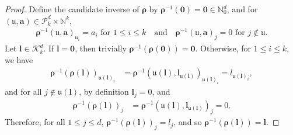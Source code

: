 \documentclass[pdflatex,sn-mathphys-num]{sn-jnl}%
\theoremstyle{thmstyleone}%
\theoremstyle{thmstyletwo}%
\theoremstyle{thmstylethree}%
\begin{document}
\begin{appendices}
\begin{proof} Define the candidate inverse of \(\boldsymbol{\rho}\) by \(\boldsymbol{\rho}^{-1}(\mathbf{0})=\mathbf{0}\in\mathbb{N}_0^d\), and for \((\mathfrak{u},\mathbf{a})\in\mathcal{P}^d_k\times\mathbb{N}^k\),
\begin{align}
    \boldsymbol{\rho}^{-1}(\mathfrak{u},\mathbf{a})_{\mathfrak{u}_i}=
        a_i \textrm{ for }1\leq i\leq k\quad\textrm{and}\quad\boldsymbol{\rho}^{-1}(\mathfrak{u},\mathbf{a})_j=0\textrm{ for }j\notin\mathfrak{u}.\nonumber
\end{align}
Let \(\boldsymbol{l}\in\mathcal{K}^d_k\). If \(\boldsymbol{l}=\mathbf{0}\), then trivially \(\boldsymbol{\rho}^{-1}(\boldsymbol{\rho}(\mathbf{0}))=\mathbf{0}\). Otherwise, for \(1\leq i\leq k\), we have
\begin{align}
    \boldsymbol{\rho}^{-1}(\boldsymbol{\rho}(\boldsymbol{l}))_{\mathfrak{u}(\boldsymbol{l})_i}&=\boldsymbol{\rho}^{-1}(\mathfrak{u}(\boldsymbol{l}),\boldsymbol{l}_{\mathfrak{u}(\boldsymbol{l})})_{\mathfrak{u}(\boldsymbol{l})_i}=l_{\mathfrak{u}(\boldsymbol{l})_i},\nonumber
\end{align}
and for all \(j\notin\mathfrak{u}(\boldsymbol{l})\), by definition \(\boldsymbol{l}_j=0\), and
\begin{align}
     \boldsymbol{\rho}^{-1}(\boldsymbol{\rho}(\boldsymbol{l}))_j&=\boldsymbol{\rho}^{-1}(\mathfrak{u}(\boldsymbol{l}),\boldsymbol{l}_{\mathfrak{u}(\boldsymbol{l})})_j=0.\nonumber
\end{align}
Therefore, for all \(1\leq j\leq d\), \(\boldsymbol{\rho}^{-1}(\boldsymbol{\rho}(\boldsymbol{l}))_j=l_j\), and so \(\boldsymbol{\rho}^{-1}(\boldsymbol{\rho}(\boldsymbol{l}))=\boldsymbol{l}\).


\end{proof}
\end{appendices}
\end{document}
